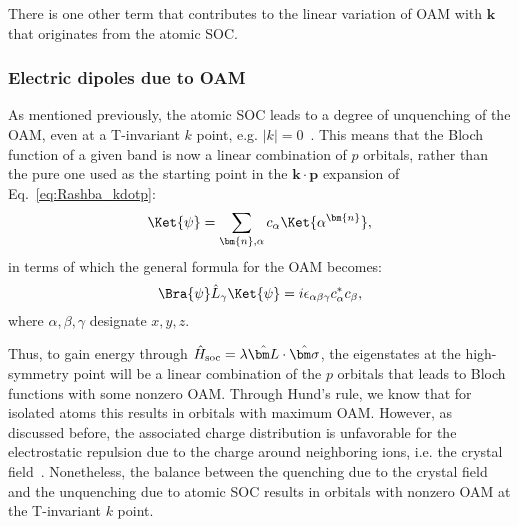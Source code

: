 There is one other term that contributes to the linear variation of OAM with $\bm{k}$ that originates from the atomic SOC.

\subsubsection{Electric dipoles due to OAM \label{sec:Rashba_SOC_part}}
As mentioned previously, the atomic SOC leads to a degree of unquenching of the OAM, even at a T-invariant $k$ point, e.g. $|k|=0$~\cite{Park2011,Park2012,Park2015}.
This means that the Bloch function of a given band is now a linear combination of $p$ orbitals, rather than the pure one used as the starting point in the $\bm k \cdot \bm p$ expansion of Eq.~\eqref{eq:Rashba_kdotp}:
\begin{equation}
\Ket{\psi} = \sum_{\bm{n},\alpha} c_\alpha \Ket{\alpha^{\bm{n}}},
\end{equation}
in terms of which the general formula for the OAM becomes:
\begin{equation}
	\Bra{\psi}\hat L_{\gamma}\Ket{\psi}= i \epsilon_{\alpha \beta \gamma} c^*_\alpha c_\beta,
\end{equation}
where $\alpha,\beta,\gamma$ designate $x,y,z$.

Thus, to gain energy through $\hat H_{\rm soc} = \lambda \hat {\bm L}\cdot \hat{\bm \sigma}$, the eigenstates at the high-symmetry point will be a linear combination of the $p$ orbitals that leads to Bloch functions with some nonzero OAM.
Through Hund's rule, we know that for isolated atoms this results in orbitals with maximum OAM.
However, as discussed before, the associated charge distribution is unfavorable for the electrostatic repulsion due to the charge around neighboring ions, i.e. the crystal field~\cite{Ballhausen}.
Nonetheless, the balance between the quenching due to the crystal field and the unquenching due to atomic SOC results in orbitals with nonzero OAM at the T-invariant $k$ point. 
    
